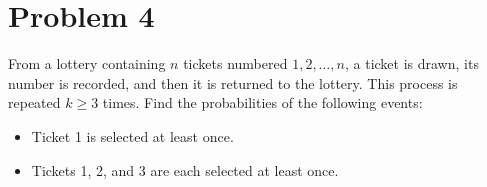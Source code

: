 \section{Problem 4}\label{hw01-problem-4}

From a lottery containing \(\mathit{n}\) tickets numbered \(1,2,\ldots,\mathit{n}\), a ticket is drawn, its number is recorded, and then it is returned to the lottery. This process is repeated \(\mathit{k} \geq 3\) times. Find the probabilities of the following events:

\begin{itemize}
\item
  Ticket 1 is selected at least once.
\item
  Tickets 1, 2, and 3 are each selected at least once.
\end{itemize}

